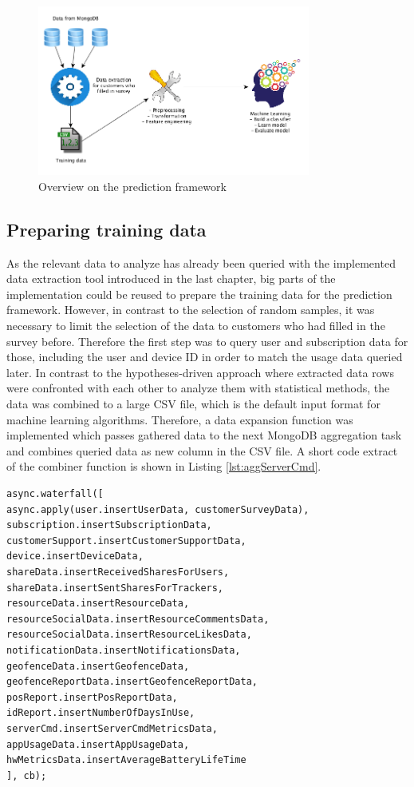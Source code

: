 \begin{figure}
	\centering
	\includegraphics[width=0.8\textwidth]{img/frameworkOverview.png}
	\caption{Overview on the prediction framework}
	\label{fig:frameworkOverview}
\end{figure} 

\subsection{Preparing training data}
As the relevant data to analyze has already been queried with the implemented data extraction tool introduced in the last chapter, big parts of the implementation could be reused to prepare the training data for the prediction framework. However, in contrast to the selection of random samples, it was necessary to limit the selection of the data to customers who had filled in the survey before. Therefore the first step was to query user and subscription data for those, including the user and device ID in order to match the usage data queried later. In contrast to the hypotheses-driven approach where extracted data rows were confronted with each other to analyze them with statistical methods, the data was combined to a large CSV file, which is the default input format for machine learning algorithms. Therefore, a data expansion function was implemented which passes gathered data to the next MongoDB aggregation task and combines queried data as new column in the CSV file. A short code extract of the combiner function is shown in Listing \ref{lst:aggServerCmd}. 

\begin{lstlisting}[caption={Expanding CSV data with results from MongoDB aggregation queries}, label={lst:aggServerCmd}]
async.waterfall([
async.apply(user.insertUserData, customerSurveyData),
subscription.insertSubscriptionData,
customerSupport.insertCustomerSupportData,
device.insertDeviceData,
shareData.insertReceivedSharesForUsers,
shareData.insertSentSharesForTrackers,
resourceData.insertResourceData,
resourceSocialData.insertResourceCommentsData,
resourceSocialData.insertResourceLikesData,
notificationData.insertNotificationsData,
geofenceData.insertGeofenceData,
geofenceReportData.insertGeofenceReportData,
posReport.insertPosReportData,
idReport.insertNumberOfDaysInUse,
serverCmd.insertServerCmdMetricsData,
appUsageData.insertAppUsageData,
hwMetricsData.insertAverageBatteryLifeTime
], cb);
\end{lstlisting}

